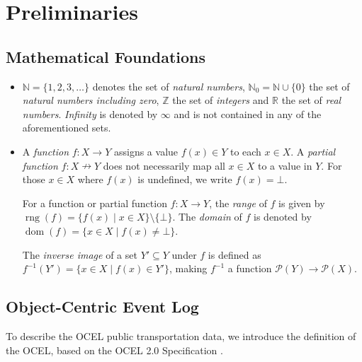 \chapter{Preliminaries}
\label{chap:prelim}

\section{Mathematical Foundations}

\begin{itemize}
  \item $\mathbb{N} = \{1, 2, 3, \dots\}$ denotes the set of \textit{natural numbers}, $\mathbb{N}_0=\mathbb{N}\cup\{0\}$ the set of \textit{natural numbers including zero}, $\mathbb{Z}$ the set of \textit{integers} and $\mathbb{R}$ the set of \textit{real numbers}. \textit{Infinity} is denoted by $\infty$ and is not contained in any of the aforementioned sets.



  \item A \textit{function} $f\colon X \to Y$ assigns a value $f(x)\in Y$ to each $x\in X$.
  A \textit{partial function} $f\colon X \nrightarrow Y$ does not necessarily map all $x\in X$ to a value in $Y$.
  For those $x\in X$ where $f(x)$ is undefined, we write $f(x)=\bot$.

  For a function or partial function $f\colon X\to Y$,
  the \textit{range} of $f$ is given by $\operatorname{rng}(f)=\{f(x)\mid x\in X\}\setminus\{\bot\}$.
  The \textit{domain} of $f$ is denoted by $\operatorname{dom}(f)=\{x\in X \mid f(x)\neq\bot\}$.

  The \textit{inverse image} of a set $Y'\subseteq Y$ under $f$ is defined as
  $f^{-1}(Y') = \{ x\in X \mid f(x) \in Y' \}$,
  making $f^{-1}$ a function $\mathcal{P}(Y)\to\mathcal{P}(X)$.

 
\end{itemize}
















\section{Object-Centric Event Log}
To describe the OCEL public transportation data, we introduce the definition of the OCEL, based on the OCEL 2.0 Specification \cite{berti2024ocelobjectcentriceventlog}.
	
